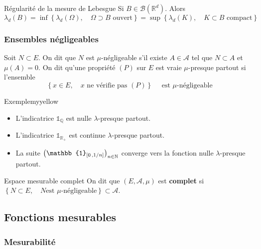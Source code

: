     \begin{theo}{Régularité de la mesure de Lebesgue}{}
        Si $B \in \mathcal{B}(\mathbb{R}^d)$. Alors 
        \[ \lambda_d(B) = \inf\left\{\lambda_d(\Omega), \quad \Omega \supset B \text{ ouvert} \right\} = \sup\left\{\lambda_d(K), \quad K \subset B \text{ compact}\right\} \]   
    \end{theo}

    \subsubsection{Ensembles négligeables}

    \begin{defi}{}{}
        Soit $N \subset E$. On dit que $N$ est $\mu$-négligeable s’il existe $A \in \mathcal{A}$ tel que $N \subset A$ et $\mu(A) = 0$. On dit qu’une propriété $(P)$ sur $E$ est vraie $\mu$-presque partout si l’ensemble 
        \[ \left\{x \in E, \quad x \text{ ne vérifie pas } (P)\right\} \quad \text{ est } \mu\text{-négligeable} \]
    \end{defi}

    \begin{omed}{Exemple}{myyellow}
        \begin{itemize}
            \item L’indicatrice $\mathbb{1}_{\mathbb{Q}}$ est nulle $\lambda$-presque partout.
            \item L’indicatrice $\mathbb{1}_{\mathbb{R}_+}$ est continue $\lambda$-presque partout.
            \item La suite $\left(\mathbb{1}_{\intervalleFF{0}{1/n}}\right)_{n \in \mathbb{N}}$ converge vers la fonction nulle $\lambda$-presque partout.
        \end{itemize}
    \end{omed}

    \begin{defi}{Espace mesurable complet}{}
        On dit que $(E,\mathcal{A},\mu)$ est \textbf{complet} si $\left\{N \subset E, \quad N \text{est } \mu\text{-négligeable}\right\} \subset \mathcal{A}$.
    \end{defi}

\subsection{Fonctions mesurables}

    \subsubsection{Mesurabilité}

